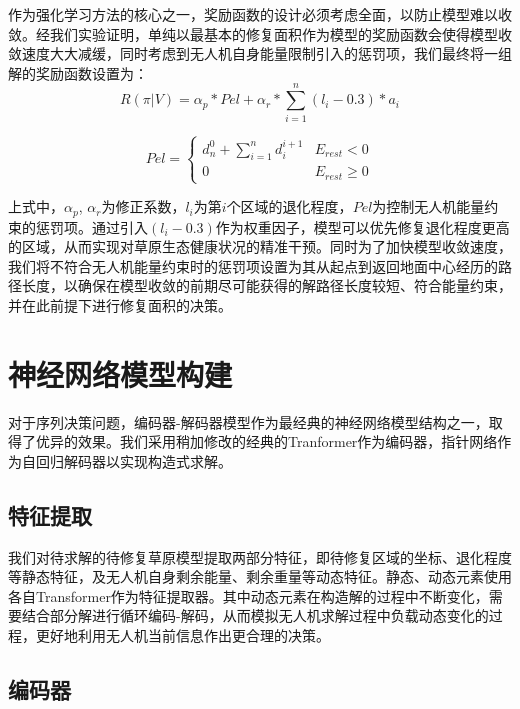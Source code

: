 \documentclass[AutoFakeBold]{LZUThesis}
\begin{document}
作为强化学习方法的核心之一，奖励函数的设计必须考虑全面，以防止模型难以收敛。经我们实验证明，单纯以最基本的修复面积作为模型的奖励函数会使得模型收敛速度大大减缓，同时考虑到无人机自身能量限制引入的惩罚项，我们最终将一组解的奖励函数设置为：
\begin{equation}
	R(\pi|V)=\alpha_{p}*Pel+\alpha_{r}*\sum_{i=1}^{n}(l_i-0.3)*a_{i}
	\label{eq:11}
\end{equation}

\begin{equation}
	Pel=\left\{\begin{array}{ll}
		d_{n}^{0}+\sum\limits_{i=1}^{n}d_{i}^{i+1} & E_{rest}<0     \\
		0                                          & E_{rest}\geq 0
	\end{array}\right.
	\label{eq:12}
\end{equation}

上式中，$\alpha_p$, $\alpha_r$为修正系数，$l_i$为第$i$个区域的退化程度，$Pel$为控制无人机能量约束的惩罚项。通过引入$(l_i-0.3)$作为权重因子，模型可以优先修复退化程度更高的区域，从而实现对草原生态健康状况的精准干预。同时为了加快模型收敛速度，我们将不符合无人机能量约束时的惩罚项设置为其从起点到返回地面中心经历的路径长度，以确保在模型收敛的前期尽可能获得的解路径长度较短、符合能量约束，并在此前提下进行修复面积的决策。

\section{神经网络模型构建}

对于序列决策问题，编码器-解码器模型\cite{vaswani2017attention}作为最经典的神经网络模型结构之一，取得了优异的效果。我们采用稍加修改的经典的Tranformer作为编码器，指针网络\cite{vinyals2015pointer}作为自回归解码器以实现构造式求解。

\subsection{特征提取}

我们对待求解的待修复草原模型提取两部分特征，即待修复区域的坐标、退化程度等静态特征，及无人机自身剩余能量、剩余重量等动态特征。静态、动态元素使用各自Transformer作为特征提取器。其中动态元素在构造解的过程中不断变化，需要结合部分解进行循环编码-解码，从而模拟无人机求解过程中负载动态变化的过程，更好地利用无人机当前信息作出更合理的决策。

\subsection{编码器}
\end{document}
